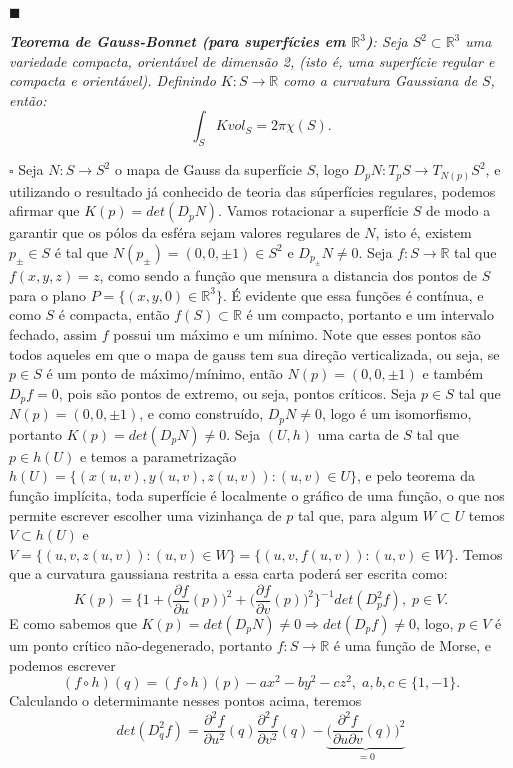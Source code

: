 \documentclass{article}
\begin{document}
	$\blacksquare$
	
	\vspace{2mm}
	\textit{\textbf{Teorema de Gauss-Bonnet (para superfícies em $\mathbb{R}^{3}$)}: Seja $S^{2} \subset \mathbb{R}^{3}$ uma variedade compacta, orientável de dimensão 2, (isto é, uma superfície regular e compacta e orientável). Definindo $K:S \to \mathbb{R}$ como a curvatura Gaussiana de $S$, então:}
	$$
	\int_{S} K vol_{S} = 2\pi \chi(S).
	$$
	
	$\square$ Seja $N : S \to S^{2}$ o mapa de Gauss da superfície $S$, logo $D_{p}N :T_{p}S \to T_{N(p)}S^{2} $, e utilizando o resultado já conhecido de teoria das súperfícies regulares, podemos afirmar que $K(p) = det(D_{p}N)$. Vamos rotacionar a superfície $S$ de modo a garantir que os pólos da esféra sejam valores regulares de $N$, isto é, existem $p_{\pm} \in S$ é tal que $N(p_{\pm}) = (0,0,\pm 1) \in S^{2}$ e $D_{p_{\pm}}N \neq 0$. Seja $f : S \to \mathbb{R}$ tal que $f(x,y,z) = z$, como sendo a função que mensura a distancia dos pontos de $S$ para o plano $P = \{(x,y,0) \in \mathbb{R}^{3} \}$. É evidente que essa funções é contínua, e como $S$ é compacta, então $f(S) \subset \mathbb{R}$ é um compacto, portanto e um intervalo fechado, assim $f$ possui um máximo e um mínimo. Note que esses pontos são todos aqueles em que o mapa de gauss tem sua direção verticalizada, ou seja, se $p \in S$ é um ponto de máximo/mínimo, então $N(p) = (0,0,\pm 1)$ e também $D_{p}f = 0$, pois são pontos de extremo, ou seja, pontos críticos. Seja $p \in S$ tal que $N(p) = (0,0,\pm 1)$, e como construído, $D_{p}N \neq 0$, logo é um isomorfismo, portanto $K(p) = det(D_{p}N) \neq 0$. Seja $(U, h)$ uma carta de $S$ tal que $p \in h(U)$ e temos a parametrização $h(U) = \{(x(u,v), y(u,v), z(u,v)): (u,v ) \in U \}$, e pelo teorema da função implícita, toda superfície é localmente o gráfico de uma função, o que nos permite escrever escolher uma vizinhança de $p$ tal que, para algum $W \subset U$ temos $V \subset h(U)$ e $V=\{(u, v , z(u,v)): (u,v) \in W\} = \{(u, v , f(u,v)): (u,v) \in W\}$. Temos que a curvatura gaussiana restrita a essa carta poderá ser escrita como:
	$$
	K(p) = \Big\{1+ \Big(\frac{\partial f}{\partial u}(p)\Big)^{2} + \Big(\frac{\partial f}{\partial v}(p)\Big)^{2} \Big\}^{-1} det(D_{p}^{2}f), \; p \in V.
	$$
	E como sabemos que $K(p) = det(D_{p}N) \neq 0 \Rightarrow  det(D_{p}f) \neq 0$, logo, $p \in V$ é um ponto crítico não-degenerado, portanto $f: S \to \mathbb{R}$ é uma função de Morse, e podemos escrever
	$$
	(f\circ h)(q) = (f\circ h)(p) - ax^{2} - by^{2} - cz^{2}, \; a,b,c \in \{1,-1\}.
	$$
	Calculando o determimante nesses pontos acima, teremos 
	$$
	det(D_{q}^{2}f) = \frac{\partial^{2} f}{\partial u^{2}}(q)\frac{\partial^{2} f}{\partial v^{2}}(q) - \underbrace{ \Big(\frac{\partial^{2} f}{\partial u \partial v}(q)\Big)^{2} }_{=0}
	$$
\end{document}

